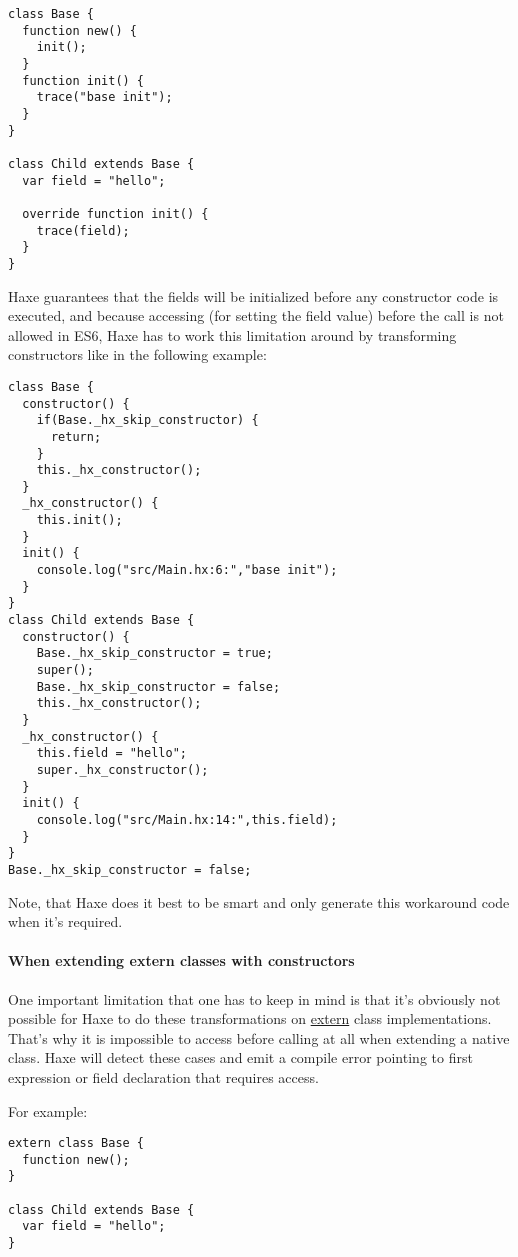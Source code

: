 \begin{lstlisting}
class Base {
  function new() {
    init();
  }
  function init() {
    trace("base init");
  }
}

class Child extends Base {
  var field = "hello";

  override function init() {
    trace(field);
  }
}
\end{lstlisting}

Haxe guarantees that the fields will be initialized before any constructor code is executed, and because accessing  (for setting the field value) before the  call is not allowed in ES6, Haxe has to work this limitation around by transforming constructors like in the following example:

\begin{lstlisting}
class Base {
  constructor() {
    if(Base._hx_skip_constructor) {
      return;
    }
    this._hx_constructor();
  }
  _hx_constructor() {
    this.init();
  }
  init() {
    console.log("src/Main.hx:6:","base init");
  }
}
class Child extends Base {
  constructor() {
    Base._hx_skip_constructor = true;
    super();
    Base._hx_skip_constructor = false;
    this._hx_constructor();
  }
  _hx_constructor() {
    this.field = "hello";
    super._hx_constructor();
  }
  init() {
    console.log("src/Main.hx:14:",this.field);
  }
}
Base._hx_skip_constructor = false;
\end{lstlisting}

Note, that Haxe does it best to be smart and only generate this workaround code when it's required.

\paragraph{When extending extern classes with constructors}

One important limitation that one has to keep in mind is that it's obviously not possible for Haxe to do these transformations on \href{https://haxe.org/manual/lf-externs.html}{extern} class implementations. That's why it is impossible to access  before calling  at all when extending a native  class. Haxe will detect these cases and emit a compile error pointing to first expression or field declaration that requires  access.

For example:

\begin{lstlisting}
extern class Base {
  function new();
}

class Child extends Base {
  var field = "hello";
}
\end{lstlisting}

